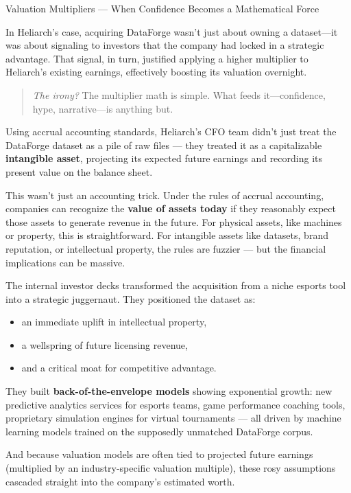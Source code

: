 \begin{HistoricalSidebar}{Valuation Multipliers --- When Confidence Becomes a Mathematical Force}
    \medskip
    
    In Heliarch’s case, acquiring DataForge wasn’t just about owning a dataset—it was about signaling to investors that the company had locked in a strategic advantage.  
    That signal, in turn, justified applying a higher multiplier to Heliarch’s existing earnings, effectively boosting its valuation overnight.
    
    \begin{quote}
    \textit{The irony?}  
    The multiplier math is simple.  
    What feeds it—confidence, hype, narrative—is anything but.
    \end{quote}
    
\end{HistoricalSidebar}

\medskip

Using accrual accounting standards, Heliarch’s CFO team didn’t just treat the DataForge dataset as a pile of raw files — they treated it as a capitalizable \textbf{intangible asset}, projecting its expected future earnings and recording its present value on the balance sheet.

This wasn’t just an accounting trick. Under the rules of accrual accounting, companies can recognize the \textbf{value of assets today} if they reasonably expect those assets to generate revenue in the future. For physical assets, like machines or property, this is straightforward. For intangible assets like datasets, brand reputation, or intellectual property, the rules are fuzzier — but the financial implications can be massive.

The internal investor decks transformed the acquisition from a niche esports tool into a strategic juggernaut. They positioned the dataset as:
\begin{itemize}
    \item an immediate uplift in intellectual property,
    \item a wellspring of future licensing revenue,
    \item and a critical moat for competitive advantage.
\end{itemize}

They built \textbf{back-of-the-envelope models} showing exponential growth: new predictive analytics services for esports teams, game performance coaching tools, proprietary simulation engines for virtual tournaments — all driven by machine learning models trained on the supposedly unmatched DataForge corpus.

And because valuation models are often tied to projected future earnings (multiplied by an industry-specific valuation multiple), these rosy assumptions cascaded straight into the company’s estimated worth.

